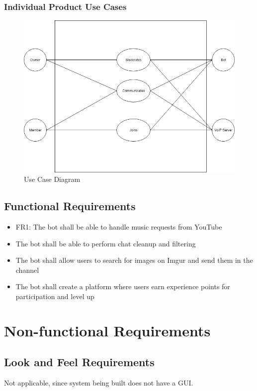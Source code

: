\documentclass[12pt, titlepage]{article}
\begin{document}
\subsubsection{Individual Product Use Cases}
\begin{figure}
   \centering
   \includegraphics[width=\linewidth]{UseCaseDiagram.png}
   \caption{Use Case Diagram}
  \label{fig:use Case Diagram}
\end{figure}

\subsection{Functional Requirements}
\begin{itemize}
\color{blue}
\item FR1: The bot shall be able to handle music requests from YouTube
\item The bot shall be able to perform chat cleanup and filtering
\item The bot shall allow users to search for images on Imgur and send them in the channel
\item The bot shall create a platform where users earn experience points for participation and level up
\end{itemize}


\section{Non-functional Requirements}

\subsection{Look and Feel Requirements}
Not applicable, since system being built does not have a GUI. 
\end{document}
